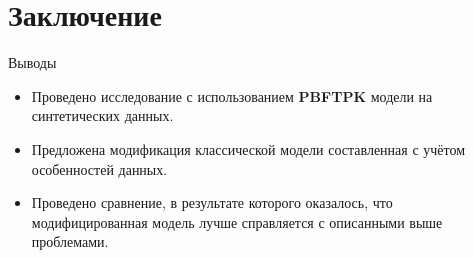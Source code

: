 \documentclass{beamer}
\begin{document}
\section{Заключение}
\begin{frame}{Выводы}
	\begin{itemize}
		\item Проведено исследование с использованием \textbf{PBFTPK} модели на синтетических данных.
		\item Предложена модификация классической модели составленная с учётом особенностей данных.
		\item Проведено сравнение, в результате которого оказалось, что модифицированная модель лучше справляется с описанными выше проблемами.
	\end{itemize}
\end{frame}
\end{document}
